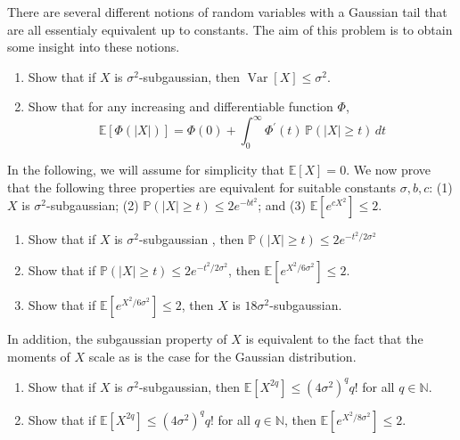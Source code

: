 \documentclass{article}
\DeclareMathOperator{\Var}{Var}
\begin{document}
  \begin{exercise}
  There are several different notions of random variables with a Gaussian tail that are all essentialy equivalent up to constants. The aim of this problem is to obtain some insight into these notions. 
  \begin{enumerate}
      \item Show that if $X$ is $\sigma^2$-subgaussian, then $\Var[X] \leq \sigma^2$. 
      \item Show that for any increasing and differentiable function $\Phi$, 
      \[\mathbb{E}[ \Phi(|X|)] = \Phi(0) + \int_0^\infty \Phi^\prime (t) \, \mathbb{P}(|X| \geq t) \, dt\]
  \end{enumerate}
  In the following, we will assume for simplicity that $\mathbb{E}[X] = 0$. We now prove that the following three properties are equivalent for suitable constants $\sigma, b, c$: (1) $X$ is $\sigma^2$-subgaussian; (2) $\mathbb{P}(|X| \geq t) \leq 2 e^{-b t^2}$; and (3) $\mathbb{E}[e^{c X^2}] \leq 2$. 
  \begin{enumerate}[resume]
      \item Show that if $X$ is $\sigma^2$-subgaussian , then $\mathbb{P}(|X| \geq t) \leq 2 e^{-t^2 / 2 \sigma^2}$ 
      \item Show that if $\mathbb{P}(|X| \geq t) \leq 2 e^{- t^2 / 2 \sigma^2}$, then $\mathbb{E}[e^{X^2 / 6 \sigma^2} ] \leq 2$. 
      \item Show that if $\mathbb{E}[e^{X^2 / 6 \sigma^2}] \leq 2$, then $X$ is $18 \sigma^2$-subgaussian. 
  \end{enumerate}
  In addition, the subgaussian property of $X$ is equivalent to the fact that the moments of $X$ scale as is the case for the Gaussian distribution. 
  \begin{enumerate}[resume]
      \item Show that if $X$ is $\sigma^2$-subgaussian, then $\mathbb{E}[X^{2q}] \leq (4 \sigma^2)^q q!$ for all $q \in \mathbb{N}$. 
      \item Show that if $\mathbb{E}[X^{2q}] \leq (4 \sigma^2)^q q!$ for all $q \in \mathbb{N}$, then $\mathbb{E}[e^{X^2 / 8 \sigma^2}] \leq 2$. 
  \end{enumerate}
  \end{exercise}
\end{document}
